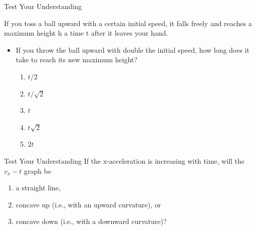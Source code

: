 \documentclass[]{beamer}
\begin{document}


\begin{frame}
    Test Your Understanding
    \vspace{3mm}
 
    
If you toss a ball upward with a certain initial speed, it falls freely and reaches a maximum 
height h a time t after it leaves your hand.
\vspace{3mm}


\begin{itemize}
        \pause
    \item If you throw the ball upward with double the initial speed, how long does it take to
    reach its new maximum height?
        \begin{enumerate}
            \item $t/2$
            \item $t/\sqrt{2}$
            \item $t$
            \item $t\sqrt{2}$
            \item $2t$
        \end{enumerate}
\end{itemize}

    
    \end{frame}






\begin{frame}
    Test Your Understanding
    \vspace{3mm}
    \pause
    If the x-acceleration is increasing with time, will the $v_x-t$ graph be

    \vspace{3mm}


\pause
    \begin{enumerate}
        \item a straight line,
        \item concave up (i.e., with an upward curvature), or
        \item concave down (i.e., with a downward curvature)?
    \end{enumerate}


    
    \end{frame}


\end{document}
